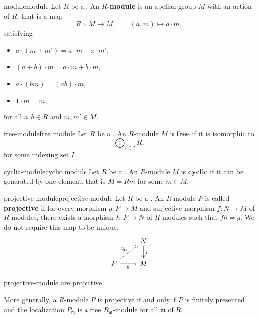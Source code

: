 \begin{topic}{module}{module}
    Let $R$ be a . An \textbf{$R$-module} is an abelian group $M$ with an action of $R$, that is a map
    \[ R \times M \to M, \qquad (a, m) \mapsto a \cdot m, \]
    satisfying
    \begin{itemize}
        \item $a \cdot (m + m') = a \cdot m + a \cdot m'$,
        \item $(a + b) \cdot m = a \cdot m + b \cdot m$,
        \item $a \cdot (bm) = (ab) \cdot m$,
        \item $1 \cdot m = m$,
    \end{itemize}
    for all $a, b \in R$ and $m, m' \in M$.
\end{topic}

\begin{topic}{free-module}{free module}
    Let $R$ be a . An $R$-module $M$ is \textbf{free} if it is isomorphic to
    \[ \bigoplus_{i \in I} R , \]
    for some indexing set $I$.
\end{topic}

\begin{topic}{cyclic-module}{cyclic module}
    Let $R$ be a . An $R$-module $M$ is \textbf{cyclic} if it can be generated by one element, that is $M = Rm$ for some $m \in M$.
\end{topic}

\begin{topic}{projective-module}{projective module}
    Let $R$ be a . An $R$-module $P$ is called \textbf{projective} if for every morphism $g : P \to M$ and surjective morphism $f : N \to M$ of $R$-modules, there exists a morphism $h : P \to N$ of $R$-modules such that $fh = g$. We do not require this map to be unique.
    \[ \begin{tikzcd} & N \arrow[twoheadrightarrow]{d}{f} \\ P \arrow[swap]{r}{g} \arrow[dashed]{ur}{\exists h} & M \end{tikzcd} \]
\end{topic}

\begin{example}{projective-module}
     are projective.
    
    More generally, a  $R$-module $P$ is projective if and only if $P$ is finitely presented and the localization $P_\mathfrak{m}$ is a free $R_\mathfrak{m}$-module for all  $\mathfrak{m}$ of $R$.
\end{example}

